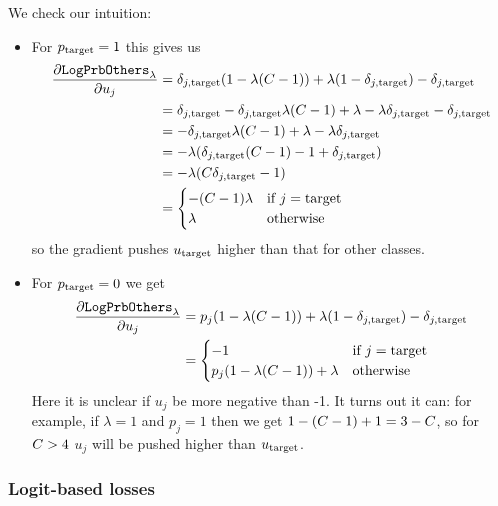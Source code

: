 \documentclass[../main.tex]{subfiles}
\begin{document}
We check our intuition:
\begin{itemize}
    \item For $p_{\mathrm{target}} = 1$ this gives us
          \begin{align*}
              \frac{\partial \mathtt{LogPrbOthers}_{\lambda}}{\partial u_j}
               & = \delta_{j, \mathrm{target}} (1 - \lambda (C - 1)) + \lambda (1 - \delta_{j, \mathrm{target}}) - \delta_{j, \mathrm{target}}      \\
               & = \delta_{j, \mathrm{target}} - \delta_{j, \mathrm{target}} \lambda (C - 1) + \lambda - \lambda \delta_{j, \mathrm{target}} - \delta_{j, \mathrm{target}} \\
               & = - \delta_{j, \mathrm{target}} \lambda (C - 1) + \lambda - \lambda \delta_{j, \mathrm{target}}             \\
               & = - \lambda (\delta_{j, \mathrm{target}} (C - 1) - 1 + \delta_{j, \mathrm{target}})                         \\
               & = - \lambda (C \delta_{j, \mathrm{target}} - 1)                                      \\
               & = \begin{cases}
                       - (C - 1) \lambda & \text{if } j = \mathrm{target} \\
                       \lambda                    & \text{otherwise}
                   \end{cases}
          \end{align*}
          so the gradient pushes $u_{\mathrm{target}}$ higher than that for other classes.

    \item For $p_{\mathrm{target}} = 0$ we get
          \begin{align*}
              \frac{\partial \mathtt{LogPrbOthers}_{\lambda}}{\partial u_j}
               & = p_j (1 - \lambda (C - 1)) + \lambda (1 - \delta_{j, \mathrm{target}}) - \delta_{j, \mathrm{target}}        \\
               & = \begin{cases}
                       -1                                           & \text{if } j = \mathrm{target} \\
                       p_j(1 - \lambda ( C -1 )) + \lambda & \text{otherwise}
                   \end{cases}
          \end{align*}
          Here it is unclear if $u_j$ be more negative than -1. It turns out it can: for example, if $\lambda = 1$ and $p_j = 1$ then we get $1 - (C -1) + 1 = 3 - C$, so for $C > 4$ $u_j$ will be pushed higher than $u_{\mathrm{target}}$.
\end{itemize}


\subsubsection{Logit-based losses}
\end{document}
